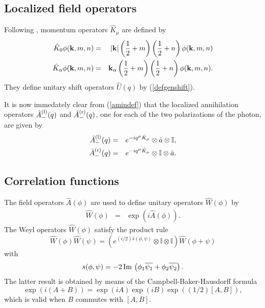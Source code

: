 \documentclass[12pt,a4paper]{article}
\def\Io{{\mathbb I}}
\def\kk{{\bf k}}
\renewcommand{\Im}{\,{\rm Im}\,}
\begin{document}
\subsection{Localized field operators}

Following \cite {CM02}, momentum operators $\hat K_\mu$ are defined by
\begin{eqnarray}
\hat K_0\phi(\kk,m,n)
&=&|\kk|\left(\frac{1}{2}+m\right)\left(\frac{1}{2}+n\right)\phi(\kk,m,n)\cr
\hat K_\alpha\phi(\kk,m,n)
&=&\kk_\alpha\left(\frac{1}{2}+m\right)\left(\frac{1}{2}+n\right)\phi(\kk,m,n).
\end{eqnarray}
They define unitary shift operators  $\hat U(q)$ by (\ref{defgenshift}).

It is now immedately clear from (\ref{amindef}) that the
localized annihilation operators $\hat A_-^{(\rm l)}(q)$ and
$\hat A_-^{(\rm r)}(q)$, one for each of the two polarizations of the photon,
are given by
\begin{eqnarray}
\hat A_-^{(\rm l)}(q)&=&e^{-iq^\mu\hat K_\mu}\otimes\hat a\otimes\Io,\cr
\hat A_-^{(\rm r)}(q)&=&e^{-iq^\mu\hat K_\mu}\otimes\Io\otimes\hat a.
\end{eqnarray}

\subsection{Correlation functions}

The field operators $\hat A(\phi )$
are used to define unitary operators $\hat W(\phi )$ by
\begin{eqnarray}
\hat W(\phi )
&=&\exp\left(i\hat A(\phi )\right).
\end{eqnarray}
The Weyl operators $\hat W(\phi )$ satisfy the product rule
\begin{equation}
\hat W(\phi )\hat W(\psi )=\left(e^{(i/2)\hat s(\phi ,\psi )}\otimes\Io\otimes\Io\right)
\hat W(\phi +\psi )
\end{equation}
with
\begin{equation}
s(\phi ,\psi )=-2\Im\left(\phi _1\overline{\psi _1}+\phi _2\overline{\psi _2}\right).
\end{equation}
The latter result is obtained by means of the Campbell-Baker-Hausdorff
formula
\begin{equation}
\exp\left(i(A+B)\right)=\exp\left(iA\right)\exp\left(iB\right)
\exp\left((1/2)[A,B]\right),
\end{equation}
which is valid when $B$ commutes with $[A,B]$.
\end{document}
